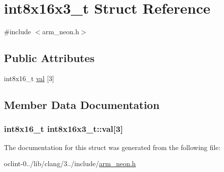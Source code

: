 \hypertarget{structint8x16x3__t}{\section{int8x16x3\-\_\-t Struct Reference}
\label{structint8x16x3__t}
}


{\ttfamily \#include $<$arm\-\_\-neon.\-h$>$}

\subsection*{Public Attributes}
\begin{DoxyCompactItemize}
\item 
int8x16\-\_\-t \hyperlink{structint8x16x3__t_ae258e50342dc66d2c3e1996167a07a28}{val} \mbox{[}3\mbox{]}
\end{DoxyCompactItemize}


\subsection{Member Data Documentation}
\hypertarget{structint8x16x3__t_ae258e50342dc66d2c3e1996167a07a28}{
\subsubsection[{val}]{\setlength{\rightskip}{0pt plus 5cm}int8x16\-\_\-t int8x16x3\-\_\-t\-::val\mbox{[}3\mbox{]}}}\label{structint8x16x3__t_ae258e50342dc66d2c3e1996167a07a28}


The documentation for this struct was generated from the following file\-:\begin{DoxyCompactItemize}
\item 
oclint-\/0../lib/clang/3../include/\hyperlink{arm__neon_8h}{arm\-\_\-neon.\-h}\end{DoxyCompactItemize}
